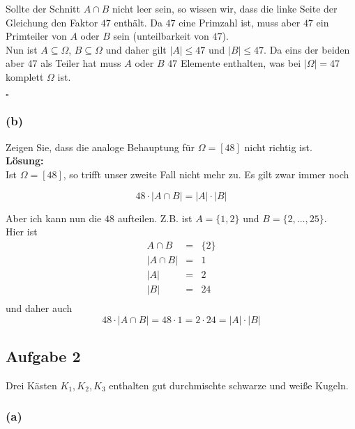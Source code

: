 \documentclass[11pt,a4paper,ngerman]{article}
\begin{document}
Sollte der Schnitt $A \cap B$ nicht leer sein, so wissen wir, dass die linke Seite der Gleichung den Faktor $47$ enthält. Da $47$ eine Primzahl ist, muss
aber $47$ ein Primteiler von $A$ oder $B$ sein (unteilbarkeit von $47$).\\

Nun ist $A \subseteq \Omega$, $B \subseteq \Omega$ und daher gilt $|A| \leq 47$ und $|B| \leq 47$. Da eins der beiden aber $47$ als Teiler hat muss $A$ oder $B$
$47$ Elemente enthalten, was bei $|\Omega| = 47$ komplett $\Omega$ ist.

\mbox{}\hfill$\square$

\subsubsection*{(b)}

Zeigen Sie, dass die analoge Behauptung für $\Omega = [48]$ nicht richtig ist.\\

\textbf{Lösung:}\\

Ist $\Omega = \left[ 48 \right]$, so trifft unser zweite Fall nicht mehr zu. Es gilt zwar immer noch

\[
    48 \cdot \left| A \cap B \right| = |A| \cdot |B|
\]

Aber ich kann nun die $48$ aufteilen. Z.B. ist $A = \{1,2\}$ und $B = \{2,\ldots,25\}$.\\

Hier ist
\[
    \begin{array}{rcl}
        A \cap B    &=& \{2\}\\
        |A \cap B| &=& 1\\
        |A|     &=& 2\\
        |B|     &=& 24\\
    \end{array}
\]
und daher auch
\[
    48 \cdot \left| A \cap B \right| = 48 \cdot 1 = 2 \cdot 24 = |A| \cdot |B|
\]

\subsection*{Aufgabe 2}

Drei Kästen $K_1,K_2,K_3$ enthalten gut durchmischte schwarze und weiße Kugeln.\\

\subsubsection*{(a)}
\end{document}
